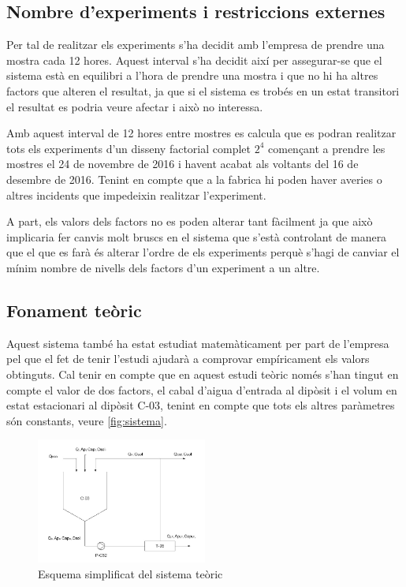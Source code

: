 \documentclass[a4paper]{article}
\begin{document}
\subsection{Nombre d'experiments i restriccions externes}
Per tal de realitzar els experiments s'ha decidit amb l'empresa de prendre una mostra cada 12 hores. Aquest interval s'ha decidit així per assegurar-se que el sistema està en equilibri a l'hora de prendre una mostra i que no hi ha altres factors que alteren el resultat, ja que si el sistema es trobés en un estat transitori el resultat es podria veure afectar i això no interessa.

Amb aquest interval de 12 hores entre mostres es calcula que es podran realitzar tots els experiments d'un disseny factorial complet $2^4$ començant a prendre les mostres el 24 de novembre de 2016 i havent acabat als voltants del 16 de desembre de 2016. Tenint en compte que a la fabrica hi poden haver averies o altres incidents que impedeixin realitzar l'experiment.

A part, els valors dels factors no es poden alterar tant fàcilment ja que això implicaria fer canvis molt bruscs en el sistema que s'està controlant de manera que el que es farà és alterar l'ordre de els experiments perquè s'hagi de canviar el mínim nombre de nivells dels factors d'un experiment a un altre.

\subsection{Fonament teòric}
Aquest sistema també ha estat estudiat matemàticament per part de l'empresa pel que el fet de tenir l'estudi ajudarà a comprovar empíricament els valors obtinguts. Cal tenir en compte que en aquest estudi teòric només s'han tingut en compte el valor de dos factors, el cabal d'aigua d'entrada al dipòsit i el volum en estat estacionari al dipòsit C-03, tenint en compte que tots els altres paràmetres són constants, veure \autoref{fig:sistema}.

\begin{figure}[H]
		\centering
		\includegraphics[width=0.5\textwidth]{images/graphs/sistema}
		\caption{Esquema simplificat del sistema teòric}
		\label{fig:sistema}
\end{figure}
\end{document}
